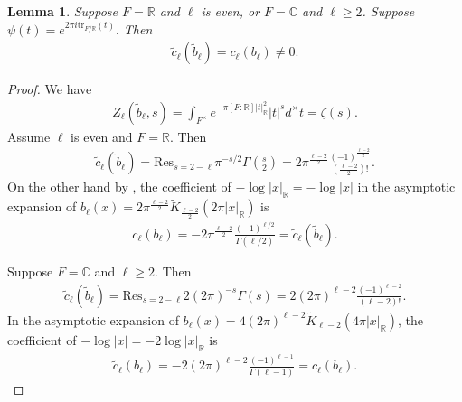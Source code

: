 \documentclass[11pt,a4paper,reqno]{amsart}
\newtheorem{lem}[thm]{Lemma}
\theoremstyle{remark}
\numberwithin{equation}{section}
\newcommand{\CC}{\mathbb{C}}
\newcommand{\RR}{\mathbb{R}}
\theoremstyle{definition}
\numberwithin{equation}{section}
\begin{document}
\begin{lem}\label{lem:cequal}
    Suppose $F=\RR$ and $\ell$ is even, or $F=\CC$ and $\ell\ge 2$. Suppose $\psi(t)=e^{2\pi i\mathrm{tr}_{F/\RR}(t)}.$ Then
    \begin{align*}
        \tilde{c}_\ell(\tilde{b}_\ell)=c_\ell(b_\ell)\neq 0.
    \end{align*}
\end{lem}

\begin{proof}
     We have
    \begin{align*}
        Z_{\ell}(\tilde{b}_\ell,s)=\int_{F^\times} e^{-\pi [F:\RR]|t|_\RR^2}|t|^s d^\times t=\zeta(s).
    \end{align*}
    Assume $\ell$ is even and $F=\RR$. Then
    \begin{align*}
    \tilde{c}_\ell(\tilde{b}_\ell)=\mathrm{Res}_{s=2-\ell} \pi^{-s/2}\Gamma\left(\frac{s}{2}\right)=2\pi^{\frac{\ell-2}{2}}\frac{(-1)^{\frac{\ell-2}{2}}}{\left(\frac{\ell-2}{2}\right)!}.
    \end{align*}
    On the other hand by \cite[\S 7.2, (12), (37), (38)]{Highertrans:II}, the coefficient of $-\log |x|_\RR=-\log |x|$ in the asymptotic expansion of $b_\ell(x)=2\pi^{\frac{\ell-2}{2}}\widetilde{K}_{\frac{\ell-2}{2}}(2\pi|x|_\RR)$ is
    \begin{align*}
        c_\ell(b_\ell)=-2\pi^{\frac{\ell-2}{2}}\frac{(-1)^{\ell/2}}{\Gamma(\ell/2)}=\tilde{c}_\ell(\tilde{b}_\ell).
    \end{align*}

    Suppose $F=\CC$ and $\ell\ge 2$. Then
    \begin{align*}
\tilde{c}_\ell(\tilde{b}_\ell)=\mathrm{Res}_{s=2-\ell} 2(2\pi)^{-s}\Gamma(s)=2(2\pi)^{\ell-2}\frac{(-1)^{\ell-2}}{(\ell-2)!}.
    \end{align*}
In the asymptotic expansion of $b_\ell(x)=4(2\pi)^{\ell-2}\widetilde{K}_{\ell-2}(4\pi |x|_\RR)$, the coefficient of $-\log |x|=-2\log |x|_\RR$ is
    \begin{align*}
        \tilde{c}_\ell(b_\ell)=-2(2\pi)^{\ell-2}\frac{(-1)^{\ell-1}}{\Gamma(\ell-1)}=c_\ell(b_\ell).
    \end{align*}
    \end{proof}
\end{document}
